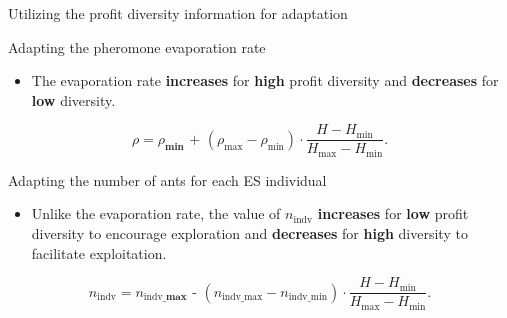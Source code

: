 \documentclass[aspectratio=169]{beamer}
\begin{document}
\begin{frame}{Utilizing the profit diversity information for adaptation}
    \begin{block}{Adapting the pheromone evaporation rate}
        \vspace{0.1cm}
        \begin{itemize}
            \item The evaporation rate \textbf{increases} for \textbf{high} profit diversity and \textbf{decreases} for \textbf{low} diversity.
        \end{itemize}
        \begin{equation}\label{eq:adaptrho}
            \rho = \rho_{\textbf{min}} \textbf{ + } (\rho_{\text{max}} - \rho_{\text{min}}) \cdot \frac{H - H_{\text{min}}}{H_{\text{max}} - H_{\text{min}}}.
        \end{equation}
        \vspace{0.1cm}
    \end{block}
    \begin{block}{Adapting the number of ants for each ES individual}
        \vspace{0.1cm}
        \begin{itemize}
            \item Unlike the evaporation rate, the value of $n_{\text{indv}}$ \textbf{increases} for \textbf{low} profit diversity to encourage exploration and \textbf{decreases} for \textbf{high} diversity to facilitate exploitation.
        \end{itemize}
        \begin{equation} \label{eq:adaptants}
            n_{\text{indv}} = n_{\text{indv\_}\textbf{max}} \textbf{ - } (n_{\text{indv\_max}} - n_{\text{indv\_min}}) \cdot \frac{H - H_{\text{min}}}{H_{\text{max}} - H_{\text{min}}}.
        \end{equation}
        \vspace{0.1cm}
    \end{block}
\end{frame}
\end{document}
